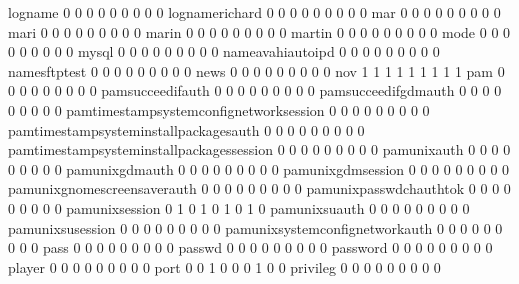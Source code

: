 \documentclass[compress,8pt]{beamer}
\begin{document}
\begin{frame}
\begin{Schunk}
  logname                                    0   0   0   0   0   0   0   0   0
  lognamerichard                             0   0   0   0   0   0   0   0   0
  mar                                        0   0   0   0   0   0   0   0   0
  mari                                       0   0   0   0   0   0   0   0   0
  marin                                      0   0   0   0   0   0   0   0   0
  martin                                     0   0   0   0   0   0   0   0   0
  mode                                       0   0   0   0   0   0   0   0   0
  mysql                                      0   0   0   0   0   0   0   0   0
  nameavahiautoipd                           0   0   0   0   0   0   0   0   0
  namesftptest                               0   0   0   0   0   0   0   0   0
  news                                       0   0   0   0   0   0   0   0   0
  nov                                        1   1   1   1   1   1   1   1   1
  pam                                        0   0   0   0   0   0   0   0   0
  pamsucceedifauth                           0   0   0   0   0   0   0   0   0
  pamsucceedifgdmauth                        0   0   0   0   0   0   0   0   0
  pamtimestampsystemconfignetworksession     0   0   0   0   0   0   0   0   0
  pamtimestampsysteminstallpackagesauth      0   0   0   0   0   0   0   0   0
  pamtimestampsysteminstallpackagessession   0   0   0   0   0   0   0   0   0
  pamunixauth                                0   0   0   0   0   0   0   0   0
  pamunixgdmauth                             0   0   0   0   0   0   0   0   0
  pamunixgdmsession                          0   0   0   0   0   0   0   0   0
  pamunixgnomescreensaverauth                0   0   0   0   0   0   0   0   0
  pamunixpasswdchauthtok                     0   0   0   0   0   0   0   0   0
  pamunixsession                             0   1   0   1   0   1   0   1   0
  pamunixsuauth                              0   0   0   0   0   0   0   0   0
  pamunixsusession                           0   0   0   0   0   0   0   0   0
  pamunixsystemconfignetworkauth             0   0   0   0   0   0   0   0   0
  pass                                       0   0   0   0   0   0   0   0   0
  passwd                                     0   0   0   0   0   0   0   0   0
  password                                   0   0   0   0   0   0   0   0   0
  player                                     0   0   0   0   0   0   0   0   0
  port                                       0   0   1   0   0   0   1   0   0
  privileg                                   0   0   0   0   0   0   0   0   0

\end{Schunk}
\end{frame}
\end{document}

